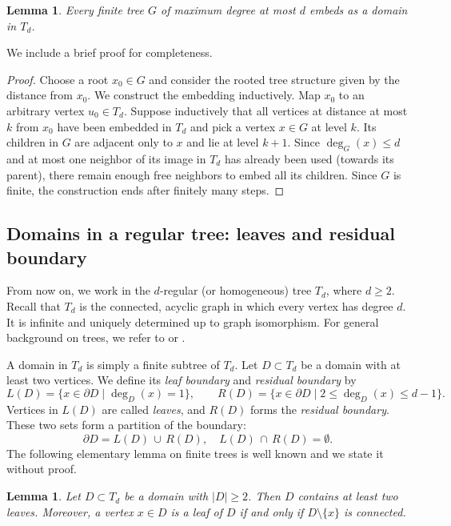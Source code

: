 \documentclass[a4paper, 11pt]{article}
\numberwithin{equation}{section}
\newtheorem{lemma}[theorem]{Lemma}
\theoremstyle{definition}
\theoremstyle{remark}
\begin{document}
\medskip

\begin{lemma}\label{lem:embedding}
Every finite tree $G$ of maximum degree at most $d$ embeds  as a domain in $T_d$.
\end{lemma}

We include a brief proof for completeness.
\begin{proof}
Choose a root $x_0\in G$ and consider the rooted tree structure given by the distance from $x_0$. We construct the embedding inductively. 
Map $x_0$ to an arbitrary vertex $u_0\in T_d$. Suppose inductively that all vertices at distance at most $k$ from $x_0$ have been embedded in $T_d$ and pick a vertex $x\in G$ at level $k$. Its children in $G$ are adjacent only to $x$ and lie at level $k+1$.
Since $\deg_G(x)\le d$ and at most one neighbor of its image in $T_d$ has already been used (towards its parent),
there remain enough free neighbors to embed all its children.  
Since $G$ is finite, the construction ends after finitely many steps.
\end{proof}

\medskip

\subsection{Domains in a regular tree: leaves and residual boundary}

From now on, we work in the $d$-regular (or homogeneous) tree $T_d$, where $d\ge 2$. 
Recall that $T_d$ is the connected, acyclic graph in which every vertex has degree $d$. 
It is infinite and uniquely determined up to graph isomorphism. 
For general background on trees, we refer to \cite[Section~1.5]{Diestel} or \cite{West}. 

\medskip

A domain in $T_d$ is simply a finite subtree of $T_d$. Let $D\subset T_d$ be a domain with at least two vertices. 
We define its \emph{leaf boundary} and \emph{residual boundary} by
\[
   L(D)=\{x\in \partial D \mid \deg_D(x)=1\}, \qquad
   R(D)=\{x\in \partial D \mid   2 \leq  \deg_D(x) \leq d-1\}.
\]
Vertices in $L(D)$ are called \emph{leaves}, and $R(D)$ forms the \emph{residual boundary}. These two sets form a partition of the boundary: 
\[
   \partial D = L(D)\,\cup\, R(D), \quad L(D)\,\cap\, R(D) = \emptyset.
\]
The following elementary lemma on finite trees is well known and we state it without proof.
\begin{lemma}\label{lem:leaf-connected-complement}
Let $D\subset T_d$ be a domain with $|D|\ge 2$. Then $D$ contains at least two leaves.
Moreover, a vertex $x\in D$ is a leaf of $D$ if and only if $D\setminus\{x\}$ is connected.
\end{lemma}
\end{document}
